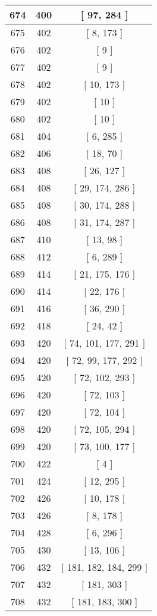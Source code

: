 \begin{center}
\begin{longtable}[H]{|| c c c ||}
\hline
674 & 400 & [ 97, 284 ] \\ 
\hline
675 & 402 & [ 8, 173 ] \\ 
\hline
676 & 402 & [ 9 ] \\ 
\hline
677 & 402 & [ 9 ] \\ 
\hline
678 & 402 & [ 10, 173 ] \\ 
\hline
679 & 402 & [ 10 ] \\ 
\hline
680 & 402 & [ 10 ] \\ 
\hline
681 & 404 & [ 6, 285 ] \\ 
\hline
682 & 406 & [ 18, 70 ] \\ 
\hline
683 & 408 & [ 26, 127 ] \\ 
\hline
684 & 408 & [ 29, 174, 286 ] \\ 
\hline
685 & 408 & [ 30, 174, 288 ] \\ 
\hline
686 & 408 & [ 31, 174, 287 ] \\ 
\hline
687 & 410 & [ 13, 98 ] \\ 
\hline
688 & 412 & [ 6, 289 ] \\ 
\hline
689 & 414 & [ 21, 175, 176 ] \\ 
\hline
690 & 414 & [ 22, 176 ] \\ 
\hline
691 & 416 & [ 36, 290 ] \\ 
\hline
692 & 418 & [ 24, 42 ] \\ 
\hline
693 & 420 & [ 74, 101, 177, 291 ] \\ 
\hline
694 & 420 & [ 72, 99, 177, 292 ] \\ 
\hline
695 & 420 & [ 72, 102, 293 ] \\ 
\hline
696 & 420 & [ 72, 103 ] \\ 
\hline
697 & 420 & [ 72, 104 ] \\ 
\hline
698 & 420 & [ 72, 105, 294 ] \\ 
\hline
699 & 420 & [ 73, 100, 177 ] \\ 
\hline
700 & 422 & [ 4 ] \\ 
\hline
701 & 424 & [ 12, 295 ] \\ 
\hline
702 & 426 & [ 10, 178 ] \\ 
\hline
703 & 426 & [ 8, 178 ] \\ 
\hline
704 & 428 & [ 6, 296 ] \\ 
\hline
705 & 430 & [ 13, 106 ] \\ 
\hline
706 & 432 & [ 181, 182, 184, 299 ] \\ 
\hline
707 & 432 & [ 181, 303 ] \\ 
\hline
708 & 432 & [ 181, 183, 300 ] \\ 

\end{longtable}
\end{center}
